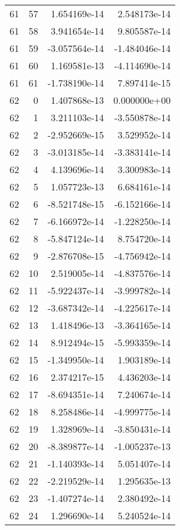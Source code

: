\begin{tabular}{rrrr}
  61 &   57 &  1.654169e-14 &  2.548173e-14 \\
  61 &   58 &  3.941654e-14 &  9.805587e-14 \\
  61 &   59 & -3.057564e-14 & -1.484046e-14 \\
  61 &   60 &  1.169581e-13 & -4.114690e-14 \\
  61 &   61 & -1.738190e-14 &  7.897414e-15 \\
  62 &    0 &  1.407868e-13 &  0.000000e+00 \\
  62 &    1 &  3.211103e-14 & -3.550878e-14 \\
  62 &    2 & -2.952669e-15 &  3.529952e-14 \\
  62 &    3 & -3.013185e-14 & -3.383141e-14 \\
  62 &    4 &  4.139696e-14 &  3.300983e-14 \\
  62 &    5 &  1.057723e-13 &  6.684161e-14 \\
  62 &    6 & -8.521748e-15 & -6.152166e-14 \\
  62 &    7 & -6.166972e-14 & -1.228250e-14 \\
  62 &    8 & -5.847124e-14 &  8.754720e-14 \\
  62 &    9 & -2.876708e-15 & -4.756942e-14 \\
  62 &   10 &  2.519005e-14 & -4.837576e-14 \\
  62 &   11 & -5.922437e-14 & -3.999782e-14 \\
  62 &   12 & -3.687342e-14 & -4.225617e-14 \\
  62 &   13 &  1.418496e-13 & -3.364165e-14 \\
  62 &   14 &  8.912494e-15 & -5.993359e-14 \\
  62 &   15 & -1.349950e-14 &  1.903189e-14 \\
  62 &   16 &  2.374217e-15 &  4.436203e-14 \\
  62 &   17 & -8.694351e-14 &  7.240674e-14 \\
  62 &   18 &  8.258486e-14 & -4.999775e-14 \\
  62 &   19 &  1.328969e-14 & -3.850431e-14 \\
  62 &   20 & -8.389877e-14 & -1.005237e-13 \\
  62 &   21 & -1.140393e-14 &  5.051407e-14 \\
  62 &   22 & -2.219529e-14 &  1.295635e-13 \\
  62 &   23 & -1.407274e-14 &  2.380492e-14 \\
  62 &   24 &  1.296690e-14 &  5.240524e-14 \\

\end{tabular}
